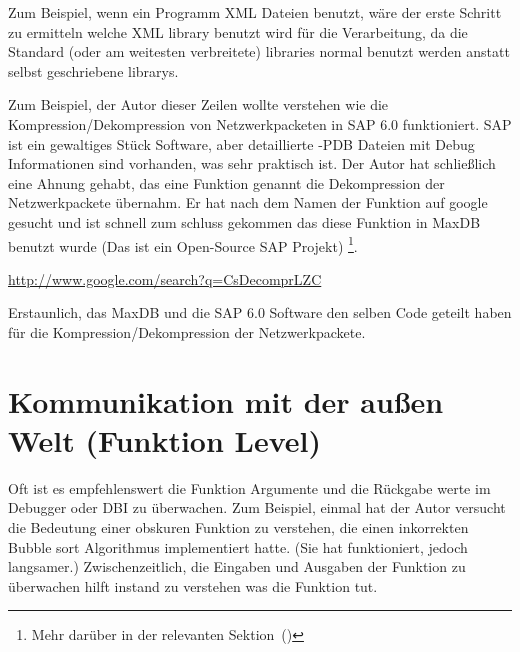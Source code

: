 
Zum Beispiel, wenn ein Programm XML Dateien benutzt, wäre der erste Schritt zu ermitteln welche
XML library benutzt wird für die Verarbeitung, da die Standard (oder am weitesten verbreitete) libraries
normal benutzt werden anstatt selbst geschriebene librarys.


Zum Beispiel, der Autor dieser Zeilen wollte verstehen wie die Kompression/Dekompression von Netzwerkpacketen in SAP 6.0 funktioniert.
SAP ist ein gewaltiges Stück Software, aber detaillierte -\gls{PDB} Dateien mit Debug Informationen sind vorhanden, was sehr praktisch 
ist. Der Autor hat schließlich eine Ahnung gehabt, das eine Funktion genannt  die Dekompression der Netzwerkpackete übernahm.
Er hat nach dem Namen der Funktion auf google gesucht und ist schnell zum schluss gekommen das diese Funktion in 
MaxDB benutzt wurde (Das ist ein Open-Source SAP Projekt) \footnote{Mehr darüber in der relevanten Sektion~()}. 

\url{http://www.google.com/search?q=CsDecomprLZC}

Erstaunlich, das MaxDB und die SAP 6.0 Software den selben Code geteilt haben für die Kompression/Dekompression der Netzwerkpackete.


\section{Kommunikation mit der außen Welt (Funktion Level)} %
Oft ist es empfehlenswert die Funktion Argumente und die Rückgabe werte im Debugger oder \ac{DBI} zu überwachen.
Zum Beispiel, einmal hat der Autor versucht die Bedeutung einer obskuren Funktion zu verstehen, die einen inkorrekten
Bubble sort Algorithmus implementiert hatte. (Sie hat funktioniert, jedoch langsamer.) 
Zwischenzeitlich, die Eingaben und Ausgaben der Funktion zu überwachen hilft instand zu verstehen was die Funktion tut.









